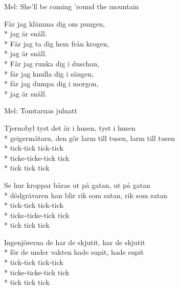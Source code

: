 \begin{SongText}
    \begin{SongInfo}
        Mel: She’ll be coming ’round the mountain
    \end{SongInfo}
    \begin{SongVerse}
        Får jag klämma dig om pungen,\\*%
        jag är snäll.\\*%
        Får jag ta dig hem från krogen,\\*%
        jag är snäll.\\*%
        Får jag runka dig i duschan,\\*%
        får jag knulla dig i sängen,\\*%
        får jag dumpa dig i morgon,\\*%
        jag är snäll.
    \end{SongVerse}
\end{SongText}
\begin{SongText}[Geigervisan ]
    \begin{SongInfo}
        Mel: Tomtarnas julnatt
    \end{SongInfo}
    \begin{SongVerse}
        Tjernobyl tyst det är i husen, tyst i husen\\*%
        geigermätarn, den gör larm till tusen, larm till tusen\\*%
        tick-tick tick-tick\\*%
        ticke-ticke-tick tick\\*%
        tick tick tick
    \end{SongVerse}
    \begin{SongVerse}
        Se hur kroppar bäras ut på gatan, ut på gatan\\*%
        dödgrävaren han blir rik som satan, rik som satan\\*%
        tick-tick tick-tick\\*%
        ticke-ticke-tick tick\\*%
        tick tick tick
    \end{SongVerse}
    \begin{SongVerse}
        Ingenjörerna de har de skjutit, har de skjutit\\*%
        för de under vakten hade supit, hade supit\\*%
        tick-tick tick-tick\\*%
        ticke-ticke-tick tick\\*%
        tick tick tick
    \end{SongVerse}
\end{SongText}

